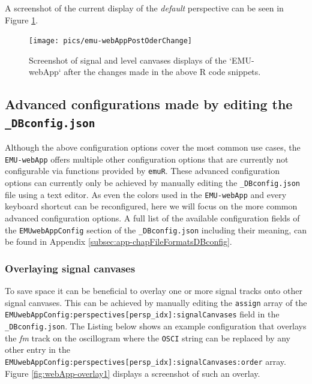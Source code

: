 \documentclass[]{book}
\begin{document}
A screenshot of the current display of the \emph{default} perspective can be seen in Figure \ref{fig:webApp-postOderChange}.

\begin{figure}

{\centering \texttt{[image: pics/emu-webAppPostOderChange]} 

}

\caption{Screenshot of signal and level canvases displays of the `EMU-webApp` after the changes made in the above R code snippets.}\label{fig:webApp-postOderChange}
\end{figure}

\hypertarget{subsec:emu-webAppAdvancedConfig}{%
\subsection{\texorpdfstring{Advanced configurations made by editing the \texttt{\_DBconfig.json}}{Advanced configurations made by editing the \_DBconfig.json}}\label{subsec:emu-webAppAdvancedConfig}}

Although the above configuration options cover the most common use cases, the \texttt{EMU-webApp} offers multiple other configuration options that are currently not configurable via functions provided by \texttt{emuR}. These advanced configuration options can currently only be achieved by manually editing the \texttt{\_DBconfig.json} file using a text editor. As even the colors used in the \texttt{EMU-webApp} and every keyboard shortcut can be reconfigured, here we will focus on the more common advanced configuration options. A full list of the available configuration fields of the \texttt{EMUwebAppConfig} section of the \texttt{\_DBconfig.json} including their meaning, can be found in Appendix \ref{subsec:app-chapFileFormatsDBconfig}.

\hypertarget{overlaying-signal-canvases}{%
\subsubsection*{Overlaying signal canvases}\label{overlaying-signal-canvases}}

To save space it can be beneficial to overlay one or more signal tracks onto other signal canvases. This can be achieved by manually editing the \texttt{assign} array of the \texttt{EMUwebAppConfig:perspectives{[}persp\_idx{]}:signalCanvases} field in the \texttt{\_DBconfig.json}. The Listing below shows an example configuration that overlays the \emph{fm} track on the oscillogram where the \texttt{OSCI} string can be replaced by any other entry in the \texttt{EMUwebAppConfig:perspectives{[}persp\_idx{]}:signalCanvases:order} array. Figure \ref{fig:webApp-overlay1} displays a screenshot of such an overlay.
\end{document}
